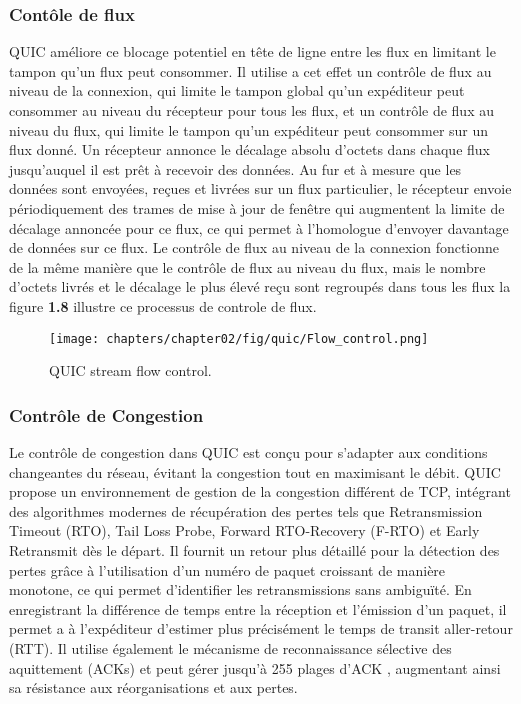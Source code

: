 \subsubsection{Contôle de flux}
QUIC améliore ce blocage potentiel en tête de ligne entre les flux en limitant le tampon qu'un flux peut consommer. Il utilise a cet effet un contrôle de flux au niveau de la connexion, qui limite le tampon global qu'un expéditeur peut consommer au niveau du récepteur pour tous les flux, et un contrôle de flux au niveau du flux, qui limite le tampon qu'un expéditeur peut consommer sur un flux donné. Un récepteur annonce le décalage absolu d'octets dans chaque flux jusqu'auquel il est prêt à recevoir des données. Au fur et à mesure que les données sont envoyées, reçues et livrées sur un flux particulier, le récepteur envoie périodiquement des trames de mise à jour de fenêtre qui augmentent la limite de décalage annoncée pour ce flux, ce qui permet à l'homologue d'envoyer davantage de données sur ce flux. Le contrôle de flux au niveau de la connexion fonctionne de la même manière que le contrôle de flux au niveau du flux, mais le nombre d'octets livrés et le décalage le plus élevé reçu sont regroupés dans tous les flux \cite{langley2017quic} la figure \textbf{1.8} illustre ce processus de controle de flux.

\begin{figure}[H]
    \centering
    \texttt{[image: chapters/chapter02/fig/quic/Flow\_control.png]}
    \caption{QUIC stream flow control.\cite{alawaji2021ietf}}
    \label{fig:gen}
\end{figure}

\subsubsection{Contrôle de Congestion}
Le contrôle de congestion dans QUIC est conçu pour s'adapter aux conditions changeantes du réseau, évitant la congestion tout en maximisant le débit. QUIC propose un environnement de gestion de la congestion différent de TCP, intégrant des algorithmes modernes de récupération des pertes tels que Retransmission Timeout (RTO), Tail Loss Probe, Forward RTO-Recovery (F-RTO) et Early Retransmit dès le départ. Il fournit un retour plus détaillé pour la détection des pertes grâce à l'utilisation d'un numéro de paquet croissant de manière monotone, ce qui permet d'identifier les retransmissions sans ambiguïté. En enregistrant la différence de temps entre la réception et l'émission d'un paquet, il permet a  à l'expéditeur d'estimer plus précisément le temps de transit aller-retour (RTT). Il utilise également le mécanisme de reconnaissance sélective des aquittement (ACKs) et peut gérer jusqu'à 255 plages d'ACK \cite{alawaji2021ietf}, augmentant ainsi sa résistance aux réorganisations et aux pertes.

